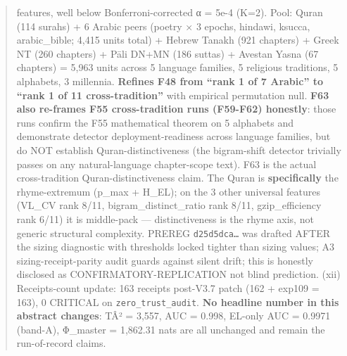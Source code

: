 \documentclass[
]{article}
\begin{document}
\begin{quote}
features, well below Bonferroni-corrected α = 5e-4 (K=2). Pool: Quran
(114 surahs) + 6 Arabic peers (poetry × 3 epochs, hindawi, ksucca,
arabic\_bible; 4,415 units total) + Hebrew Tanakh (921 chapters) + Greek
NT (260 chapters) + Pāli DN+MN (186 suttas) + Avestan Yasna (67
chapters) = 5,963 units across 5 language families, 5 religious
traditions, 5 alphabets, 3 millennia. \textbf{Refines F48 from ``rank 1
of 7 Arabic'' to ``rank 1 of 11 cross-tradition''} with empirical
permutation null. \textbf{F63 also re-frames F55 cross-tradition runs
(F59-F62) honestly}: those runs confirm the F55 mathematical theorem on
5 alphabets and demonstrate detector deployment-readiness across
language families, but do NOT establish Quran-distinctiveness (the
bigram-shift detector trivially passes on any natural-language
chapter-scope text). F63 is the actual cross-tradition
Quran-distinctiveness claim. The Quran is \textbf{specifically} the
rhyme-extremum (p\_max + H\_EL); on the 3 other universal features
(VL\_CV rank 8/11, bigram\_distinct\_ratio rank 8/11, gzip\_efficiency
rank 6/11) it is middle-pack --- distinctiveness is the rhyme axis, not
generic structural complexity. PREREG \texttt{d25d5dca…} was drafted
AFTER the sizing diagnostic with thresholds locked tighter than sizing
values; A3 sizing-receipt-parity audit guards against silent drift; this
is honestly disclosed as CONFIRMATORY-REPLICATION not blind prediction.
(xii) Receipts-count update: 163 receipts post-V3.7 patch (162 + exp109
= 163), 0 CRITICAL on \texttt{zero\_trust\_audit}. \textbf{No headline
number in this abstract changes}: TÂ² = 3,557, AUC = 0.998, EL-only AUC
= 0.9971 (band-A), Φ\_master = 1,862.31 nats are all unchanged and
remain the run-of-record claims.
\end{quote}
\end{document}
